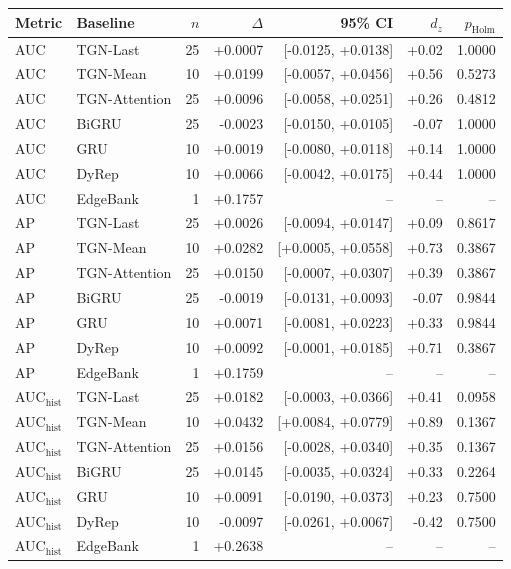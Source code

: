 \begin{tabular}{llrrrrr}
\toprule
Metric & Baseline & $n$ & $\Delta$ & 95\% CI & $d_z$ & $p_{\mathrm{Holm}}$ \\
\midrule
AUC & TGN-Last & 25 & +0.0007 & [-0.0125, +0.0138] & +0.02 & 1.0000 \\
AUC & TGN-Mean & 10 & +0.0199 & [-0.0057, +0.0456] & +0.56 & 0.5273 \\
AUC & TGN-Attention & 25 & +0.0096 & [-0.0058, +0.0251] & +0.26 & 0.4812 \\
AUC & BiGRU & 25 & -0.0023 & [-0.0150, +0.0105] & -0.07 & 1.0000 \\
AUC & GRU & 10 & +0.0019 & [-0.0080, +0.0118] & +0.14 & 1.0000 \\
AUC & DyRep & 10 & +0.0066 & [-0.0042, +0.0175] & +0.44 & 1.0000 \\
AUC & EdgeBank & 1 & +0.1757 & -- & -- & -- \\
\midrule
AP & TGN-Last & 25 & +0.0026 & [-0.0094, +0.0147] & +0.09 & 0.8617 \\
AP & TGN-Mean & 10 & +0.0282 & [+0.0005, +0.0558] & +0.73 & 0.3867 \\
AP & TGN-Attention & 25 & +0.0150 & [-0.0007, +0.0307] & +0.39 & 0.3867 \\
AP & BiGRU & 25 & -0.0019 & [-0.0131, +0.0093] & -0.07 & 0.9844 \\
AP & GRU & 10 & +0.0071 & [-0.0081, +0.0223] & +0.33 & 0.9844 \\
AP & DyRep & 10 & +0.0092 & [-0.0001, +0.0185] & +0.71 & 0.3867 \\
AP & EdgeBank & 1 & +0.1759 & -- & -- & -- \\
\midrule
AUC$_{\mathrm{hist}}$ & TGN-Last & 25 & +0.0182 & [-0.0003, +0.0366] & +0.41 & 0.0958 \\
AUC$_{\mathrm{hist}}$ & TGN-Mean & 10 & +0.0432 & [+0.0084, +0.0779] & +0.89 & 0.1367 \\
AUC$_{\mathrm{hist}}$ & TGN-Attention & 25 & +0.0156 & [-0.0028, +0.0340] & +0.35 & 0.1367 \\
AUC$_{\mathrm{hist}}$ & BiGRU & 25 & +0.0145 & [-0.0035, +0.0324] & +0.33 & 0.2264 \\
AUC$_{\mathrm{hist}}$ & GRU & 10 & +0.0091 & [-0.0190, +0.0373] & +0.23 & 0.7500 \\
AUC$_{\mathrm{hist}}$ & DyRep & 10 & -0.0097 & [-0.0261, +0.0067] & -0.42 & 0.7500 \\
AUC$_{\mathrm{hist}}$ & EdgeBank & 1 & +0.2638 & -- & -- & -- \\

\end{tabular}
